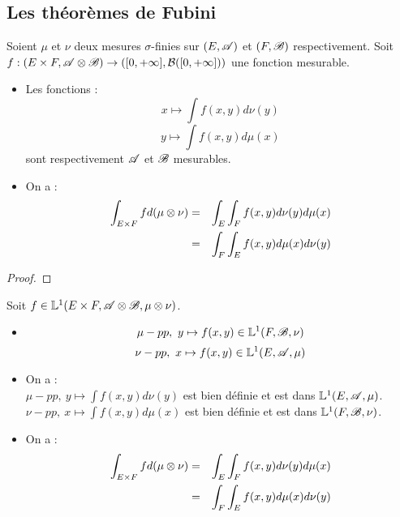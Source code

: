 \subsection{Les théorèmes de Fubini}

\begin{theorem}
	Soient $\mu$ et $\nu$ deux mesures $\sigma$-finies sur $(E, \mathscr{A})$ et $(F, \mathscr{B})$ respectivement.
	Soit $f: (E \times F, \mathscr{A} \otimes \mathscr{B}) \to ([0, +\infty], \mathcal{B}([0, +\infty]))$ une fonction mesurable.

	\begin{itemize}
		\item Les fonctions :
		      $$ x \mapsto \int f(x, y) d \nu(y)$$
		      $$ y \mapsto \int f(x, y) d \mu(x)$$
		      sont respectivement $\mathscr{A}$ et $\mathscr{B}$ mesurables.
		\item On a :
		      \begin{eqnarray*}
			      \int_{E \times F} f d(\mu \otimes \nu) & = & \int_E  \int_F f(x, y) d \nu(y) d \mu(x) \\
			      & = & \int_F  \int_E f(x, y) d \mu(x) d \nu(y)
		      \end{eqnarray*}
	\end{itemize}
\end{theorem}


\begin{proof}
\end{proof}


\begin{theorem}
	Soit $f \in \mathbb{L}^1(E \times F, \mathscr{A} \otimes \mathscr{B}, \mu \otimes \nu)$.

	\begin{itemize}
		\item $$ \mu-pp, \ y \mapsto f(x, y) \in \mathbb{L}^1(F, \mathscr{B}, \nu)$$
		      $$ \nu-pp, \ x \mapsto f(x, y) \in \mathbb{L}^1(E, \mathscr{A}, \mu)$$
		\item On a :\\
		      $\mu-pp, \ y \mapsto \int f(x, y) d \nu(y)$ est bien définie et est dans $\mathbb{L}^1(E, \mathscr{A}, \mu)$.\\
		      $\nu-pp, \ x \mapsto \int f(x, y) d \mu(x)$ est bien définie et est dans $\mathbb{L}^1(F, \mathscr{B}, \nu)$.
		\item On a :
		      \begin{eqnarray*}
			      \int_{E \times F} f d(\mu \otimes \nu) & = & \int_E  \int_F f(x, y) d \nu(y) d \mu(x) \\
			      & = & \int_F  \int_E f(x, y) d \mu(x) d \nu(y)
		      \end{eqnarray*}
	\end{itemize}
\end{theorem}


